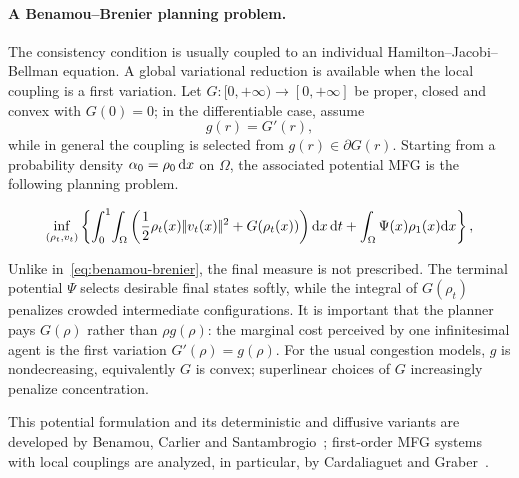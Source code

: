 \paragraph{A Benamou--Brenier planning problem.}
The consistency condition is usually coupled to an individual Hamilton--Jacobi--Bellman equation. A global variational reduction is available when the local coupling is a first variation. Let $G:[0,+\infty)\to[0,+\infty]$ be proper, closed and convex with $G(0)=0$; in the differentiable case, assume
\begin{equation}\label{eq-mfg-congestion-primitive}
		g(r)=G'(r),
\end{equation}
while in general the coupling is selected from $g(r)\in\partial G(r)$. Starting from a probability density $\alpha_0=\rho_0\,\mathrm{d} x$ on $\Omega$, the associated potential MFG is the following planning problem.
\begin{defn}\label{def-variational-mfg-planning}
\begin{equation}\label{eq-variational-mfg-velocity}
	\inf_{(\rho_t,v_t)}
	\left\{
		\int_0^1\!\int_{\Omega}
		\left(
			\frac12\rho_t(x)|\!| v_t(x) |\!|^2+G(\rho_t(x))
		\right)\mathrm{d} x\,\mathrm{d} t
		+\int_{\Omega}\Psi(x)\rho_1(x)\mathrm{d} x
	\right\},
\end{equation}
\end{defn}
Unlike in~\eqref{eq:benamou-brenier}, the final measure is not prescribed. The terminal potential $\Psi$ selects desirable final states softly, while the integral of $G(\rho_t)$ penalizes crowded intermediate configurations. It is important that the planner pays $G(\rho)$ rather than $\rho g(\rho)$: the marginal cost perceived by one infinitesimal agent is the first variation $G'(\rho)=g(\rho)$. For the usual congestion models, $g$ is nondecreasing, equivalently $G$ is convex; superlinear choices of $G$ increasingly penalize concentration.

This potential formulation and its deterministic and diffusive variants are developed by Benamou, Carlier and Santambrogio~\cite{BenamouCarlierSantambrogio2017}; first-order MFG systems with local couplings are analyzed, in particular, by Cardaliaguet and Graber~\cite{CardaliaguetGraber2015FirstOrderMFG}.

